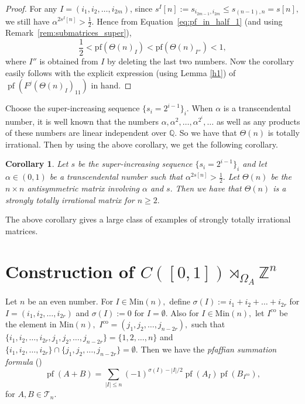 \documentclass[9pt, BCOR=2mm]{amsart}
\numberwithin{equation}{section}
\numberwithin{equation}{section}
\newtheorem{corollary}[theorem]{Corollary}
\newcommand{\Z}{{\mathbb{Z}}}
\begin{document}
\begin{proof}
	For any $I=(i_1,i_2,\ldots,i_{2m})$, since $s^I[n]:=s_{i_{2m-1},i_{2m}}\le s_{(n-1),n}=s[n],$ we still have $\alpha^{2s^I[n]}>\frac{1}{2}.$ Hence from Equation~\ref{eq:pf_in_half_1} (and using Remark~\ref{rem:submatrices_super}), 
	$$\frac{1}{2}<\mathrm{pf}\left(\Theta(n)_I\right)<\mathrm{pf}\left(\Theta(n)_{I''}\right)<1,$$ where $I''$ is obtained from $I$ by deleting the last two numbers. Now the corollary easily follows with the explicit expression (using Lemma \ref{h1}) of $\operatorname{pf}\left(F^{j}\left(\Theta(n)_I\right)_{11}\right)$  in hand.
	\end{proof}


Choose the super-increasing sequence $\{s_i=2^{i-1}\}_i.$ When $\alpha$ is a transcendental number,  it is well known that the numbers
$\alpha,\alpha^2,\dots,\alpha^{2^i},\dots$  as well as any
products of these numbers are linear independent over $\mathbb{Q}$. So we have that $\Theta(n)$ is totally
irrational.
Then by using the above corollary, we get the following corollary.
\begin{corollary}\label{cor:class_of_strongly}
   Let $s$ be the super-increasing sequence $\{s_i=2^{i-1}\}_i$ and let $\alpha\in (0,1)$  be a transcendental number such that $\alpha^{2s[n]}>\frac{1}{2}.$  Let $\Theta(n)$ be the $n\times n$
  antisymmetric matrix involving $\alpha$ and $s.$ Then we have that
  $\Theta(n)$ is a strongly totally irrational matrix for $n\geq2.$
\end{corollary}
\noindent The above corollary gives a large class of examples of strongly totally irrational matrices.
 

\section{Construction of $C([0,1])\rtimes_{ \Omega_A} \Z^n$}
\label{sec:path}

Let $n$ be an even number. For $I\in \mathrm{Min}(n),$ define $\sigma(I):= i_1+i_2+\dots+i_{2r}$ for $I=(i_1,i_2,\dots,i_{2r})$ and $\sigma(I):= 0$ for $I=\emptyset.$ Also for $I\in \mathrm{Min}(n),$ let $I^{\mathrm{co}}$ be the element in $\mathrm{Min}(n),$ $I^{\mathrm{co}}=(j_1,j_2,\dots,j_{n-2r}),$ such that $\{i_1,i_2,\dots,i_{2r},j_1,j_2,\dots,j_{n-2r}\}=\{1,2,\dots,n\}$ and $\{i_1,i_2,\dots,i_{2r}\}\cap\{j_1,j_2,\dots,j_{n-2r}\}=\emptyset.$ Then we have the \textit{pfaffian summation formula} (\cite[Lemma 4.2]{Ste90})
\begin{equation}\label{eq:sumofpaff}
	\operatorname{pf}(A+B)=\sum_{|I|\le n}(-1)^{\sigma(I)-|I| / 2} \operatorname{pf}(A_{I}) \operatorname{pf}(B_{I^{\mathrm{co}}}),
\end{equation}
 for $A, B \in \mathcal{T}_n.$
\end{document}
